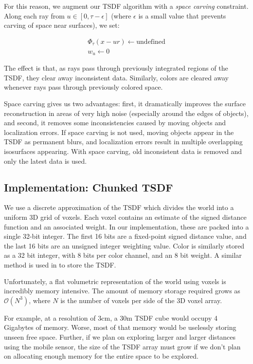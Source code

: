 \documentclass[conference,10pt]{IEEEtran}
\begin{document}
For this reason, we augment our TSDF algorithm with a \textit{space carving}
constraint. Along each ray from $u \in [0, \tau - \epsilon]$ (where $\epsilon$
is a small value that prevents carving of space near surfaces), we set:

\begin{align*}
\Phi_{\tau}(x - ur) \gets \text{undefined}
\\
%
w_u \gets 0
\end{align*}

\noindent  The effect is that, as rays pass through previously integrated
regions of the TSDF, they clear away inconsistent data. Similarly, colors are
cleared away whenever rays pass through previously colored space.

Space carving gives us two advantages: first, it dramatically improves the
surface reconstruction in areas of very high noise (especially around the edges
of objects), and second, it removes some inconsistencies caused by moving
objects and localization errors. If space carving is not used, moving objects
appear in the TSDF as permanent blurs, and localization errors result in
multiple overlapping isosurfaces appearing. With space carving, old inconsistent
data is removed and only the latest data is used.

\subsection{Implementation: Chunked TSDF}
We use a discrete approximation of the TSDF which divides the world into
a uniform 3D grid of voxels. Each voxel contains an estimate of the signed
distance function and an associated weight. In our implementation, these are
packed into a single 32-bit integer. The first 16 bits are a fixed-point
signed distance value, and the last 16 bits  are an unsigned integer weighting
value. Color is similarly stored as a 32 bit integer, with 8 bits per color
channel, and an 8 bit weight. A similar method is used in \cite{Newcombe,
Whelan2013, Bylow2013} to store the TSDF.

Unfortunately, a flat volumetric representation of the world using voxels is
incredibly memory intensive. The amount of memory storage required grows as
$\mathcal{O}(N^3)$, where $N$ is the number of voxels per side of the 3D voxel
array.

For example, at a resolution of $3\text{cm}$,  a $30\text{m}$ TSDF cube would
occupy 4 Gigabytes of memory. Worse, most of that memory would be uselessly
storing unseen free space. Further, if we plan on exploring larger and larger
distances using the mobile sensor, the size of the TSDF array must grow if we
don't plan on allocating enough memory for the entire space to be explored.
\end{document}
